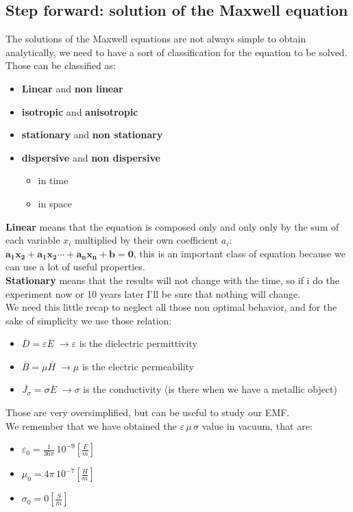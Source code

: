 \subsection*{Step forward: solution of the Maxwell equation}
The solutions of the Maxwell equations are not always simple to obtain analytically, we need to have a sort of classification for the equation to be solved. Those can be classified as:
\begin{itemize}
\item \textbf{Linear} and \textbf{non linear}
\item \textbf{isotropic} and \textbf{anisotropic}
\item \textbf{stationary} and \textbf{non stationary}
\item \textbf{dispersive} and \textbf{non dispersive}
\begin{itemize}
\item in time
\item in space
\end{itemize}
\end{itemize}
\textbf{Linear} means that the equation is composed only and only only by the sum of each variable $x_i$ multiplied by their own coefficient $a_i$: $\bm{a_1x_2+a_1x_2\cdots + a_nx_n+b=0}$, this is an important class of equation because we can use a lot of useful properties.\\
\textbf{Stationary} means that the results will not change with the time, so if i do the experiment now or 10 years later I'll be sure that nothing will change.\\
We need this little recap to neglect all those non optimal behavior, and for the sake of simplicity we use those relation:
\begin{itemize}
    \item $\overline{D}=\varepsilon \overline{E}\;\rightarrow \varepsilon$ is the dielectric permittivity
    \item $\overline{B}=\mu \overline{H}\;\rightarrow \mu$ is the electric permeability
    \item $\overline{J_\sigma}=\sigma \overline{E}\;\rightarrow \sigma$ is the conductivity (is there when we have a metallic object)
\end{itemize}
Those are very oversimplified, but can be useful to study our EMF.\\
We remember that we have obtained the $\varepsilon \, \mu \, \sigma$ value in vacuum, that are:
\begin{itemize}
    \item $\varepsilon_0=\frac{1}{36\pi}\,10^{-9} \left[\frac{F}{m}\right]$
    \item $\mu_0=4\pi\,10^{-7} \left[\frac{H}{m}\right]$
    \item $\sigma_0=0 \left[\frac{S}{m}\right]$
\end{itemize}

